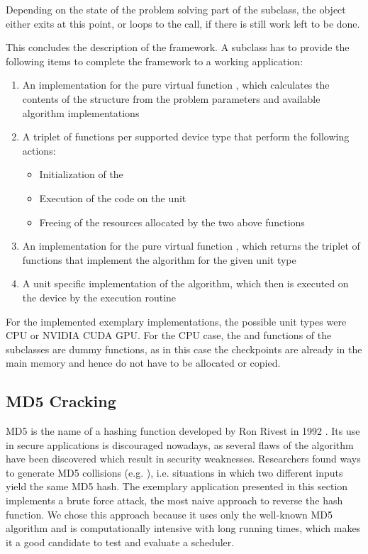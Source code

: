 Depending on the state of the problem solving part of the subclass, the  object either exits at this point, or loops to the  call, if there is still work left to be done.

This concludes the description of the framework. A subclass has to provide the following items to complete the framework to a working application:
\begin{enumerate}
	\item An implementation for the pure virtual function , which calculates the contents of the  structure from the problem parameters and available algorithm implementations
	\item A triplet of functions per supported device type that perform the following actions:
	\begin{itemize}
		\item Initialization of the \cu{}
		\item Execution of the code on the unit
		\item Freeing of the resources allocated by the two above functions
	\end{itemize}
	\item An implementation for the pure virtual function , which returns the triplet of functions that implement the algorithm for the given unit type
	\item A unit specific implementation of the algorithm, which then is executed on the device by the execution routine
\end{enumerate}

For the implemented exemplary implementations, the possible unit types were CPU or NVIDIA CUDA GPU. For the CPU case, the  and  functions of the subclasses are dummy functions, as in this case the checkpoints are already in the main memory and hence do not have to be allocated or copied.

\subsection{MD5 Cracking}
	\label{Implementation:Userside:MD5}
MD5 is the name of a hashing function developed by Ron Rivest in 1992 \cite{rivest1992md5}. Its use in secure applications is discouraged nowadays, as several flaws of the algorithm have been discovered which result in security weaknesses. Researchers found ways to generate MD5 collisions (e.g. \cite{stevens2009cpc}), i.e. situations in which two different inputs yield the same MD5 hash. The exemplary application presented in this section implements a brute force attack, the most naive approach to reverse the hash function. We chose this approach because it uses only the well-known MD5 algorithm and is computationally intensive with long running times, which makes it a good candidate to test and evaluate a scheduler.
	
